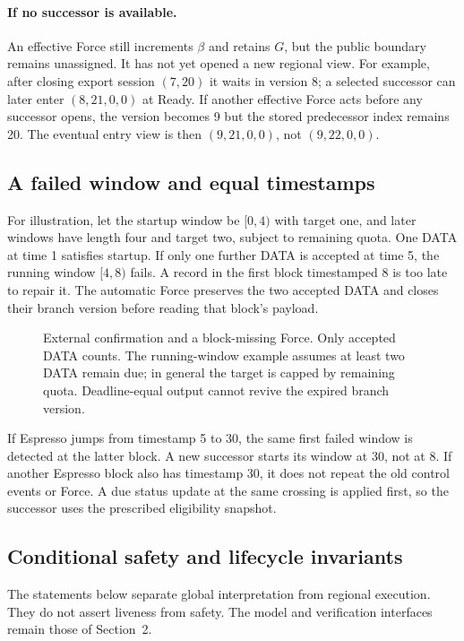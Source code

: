 \documentclass[11pt,a4paper]{article}
\begin{document}
\paragraph{If no successor is available.}
An effective Force still increments $\beta$ and retains $G$, but the
public boundary remains unassigned. It has not yet opened a new regional view.
For example, after closing export session $(7,20)$ it waits in version
8; a selected successor can later enter $(8,21,0,0)$ at Ready.
If another effective Force acts before any successor opens, the version
becomes 9 but the stored predecessor index remains 20. The eventual
entry view is then $(9,21,0,0)$, not $(9,22,0,0)$.

\subsection{A failed window and equal timestamps}
\label{sec:window-example}
For illustration, let the startup window be $[0,4)$ with target one,
and later windows have length four and target two, subject to remaining
quota. One DATA at time 1 satisfies startup. If only one further DATA
is accepted at time 5, the running window $[4,8)$ fails.
A record in the first block timestamped 8 is too late to repair it.
The automatic Force preserves the two accepted DATA and closes their
branch version before reading that block's payload.

\begin{figure}[htbp]\centering

\caption{External confirmation and a block-missing Force. Only accepted
DATA counts. The running-window example assumes at least two DATA
remain due; in general the target is capped by remaining quota.
Deadline-equal output cannot revive the expired branch version.}
\label{fig:observer-finality}
\end{figure}
\FloatBarrier

If Espresso jumps from timestamp 5 to 30, the same first failed window
is detected at the latter block. A new successor starts its window at
30, not at 8. If another Espresso block also has timestamp 30, it does
not repeat the old control events or Force. A due status update at the
same crossing is applied first, so the successor uses the prescribed
eligibility snapshot.

\subsection{Conditional safety and lifecycle invariants}
\label{sec:safety-argument}
The statements below separate global interpretation from regional
execution. They do not assert liveness from safety. The model and
verification interfaces remain those of Section~2.
\end{document}
